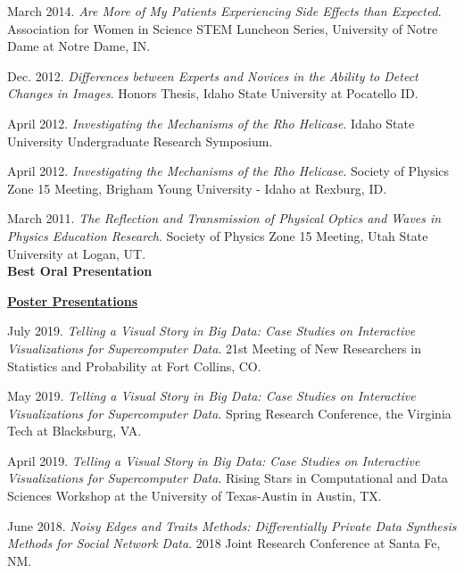 \documentclass[11pt, letterpaper, roman]{moderncv} %
\begin{document}
\begin{etaremune}[topsep=0pt, itemsep=5pt, partopsep=0pt, parsep=0pt]
    \item March 2014. \textit{Are More of My Patients Experiencing Side Effects than Expected}. Association for Women in Science STEM Luncheon Series, University of Notre Dame at Notre Dame, IN.
    
    \item Dec. 2012. \textit{Differences between Experts and Novices in the Ability to Detect Changes in Images}. Honors Thesis, Idaho State University at Pocatello ID.
    
    \item April 2012. \textit{Investigating the Mechanisms of the Rho Helicase}. Idaho State University Undergraduate Research Symposium.
    
    \item April 2012. \textit{Investigating the Mechanisms of the Rho Helicase}. Society of Physics Zone 15 Meeting, Brigham Young University - Idaho at Rexburg, ID.
    
    \item March 2011. \textit{The Reflection and Transmission of Physical Optics and Waves in Physics Education Research}. Society of Physics Zone 15 Meeting, Utah State University at Logan, UT.\\
    \textbf{Best Oral Presentation}
  
\vspace{8pt}
\hspace{-0.30in}\underline{\textbf{\large Poster Presentations}}\normalsize
    \item July 2019. \textit{Telling a Visual Story in Big Data: Case Studies on Interactive Visualizations for Supercomputer Data}. 21st Meeting of New Researchers in Statistics and Probability at Fort Collins, CO.
    
    \item May 2019. \textit{Telling a Visual Story in Big Data: Case Studies on Interactive Visualizations for Supercomputer Data}. Spring Research Conference, the Virginia Tech at Blacksburg, VA.
    
    \item April 2019. \textit{Telling a Visual Story in Big Data: Case Studies on Interactive Visualizations for Supercomputer Data}. Rising Stars in Computational and Data Sciences Workshop at the University of Texas-Austin in Austin, TX.
    
    \item June 2018. \textit{Noisy Edges and Traits Methods: Differentially Private Data Synthesis Methods for Social Network Data}. 2018 Joint Research Conference at Santa Fe, NM.
    

\end{etaremune}
\end{document}
